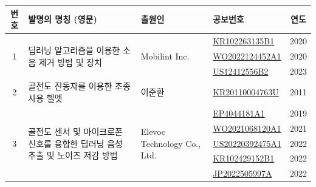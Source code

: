 \documentclass{article}
\begin{document}
\begin{table}[!h]
    \centering
    \renewcommand{\arraystretch}{1.2}
    \begin{tabular}{|c|p{6.5cm}|p{3.5cm}|p{3cm}|c|}
    \hline
    번호 & 발명의 명칭 (영문) & 출원인 & 공보번호 & 연도 \\
    \hline
    
    \multirow{3}{*}{1} 
    & \multirow{3}{=}{딥러닝 알고리즘을 이용한 소음 제거 방법 및 장치} 
    & \multirow{3}{=}{Mobilint Inc.} 
    & \href{https://patents.google.com/patent/KR102263135B1/en?oq=KR102263135B1}{KR102263135B1} & 2020 \\ \cline{4-5}
    &  &  & \href{https://patents.google.com/patent/WO2022124452A1/en?oq=KR102263135B1}{WO2022124452A1} & 2020 \\ \cline{4-5}
    &  &  & \href{https://patents.google.com/patent/US12412556B2/en?oq=KR102263135B1}{US12412556B2} & 2023 \\
    \hline
    
    2 
    & 골전도 진동자를 이용한 조종사용 헬멧 
    & 이준환 
    & \href{https://patents.google.com/patent/KR20110004763U/en?oq=KR20110004763U}{KR20110004763U} 
    & 2011 \\
    \hline
    
    \multirow{5}{*}{3} 
    & \multirow{5}{=}{골전도 센서 및 마이크로폰 신호를 융합한 딥러닝 음성 추출 및 노이즈 저감 방법} 
    & \multirow{5}{=}{Elevoc Technology Co., Ltd.} 
    & \href{https://patents.google.com/patent/EP4044181A4/en?oq=US20220392475A1}{EP4044181A1} & 2019 \\ \cline{4-5}
    &  &  & \href{https://patents.google.com/patent/WO2021068120A1/en?oq=US20220392475A1}{WO2021068120A1} & 2021 \\ \cline{4-5}
    &  &  & \href{https://patents.google.com/patent/US20220392475A1/en?oq=US20220392475A1}{US20220392475A1} & 2022 \\ \cline{4-5}
    &  &  & \href{https://patents.google.com/patent/KR102429152B1/en?oq=US20220392475A1}{KR102429152B1} & 2022 \\ \cline{4-5}
    &  &  & \href{https://patents.google.com/patent/JP2022505997A/en?oq=US20220392475A1}{JP2022505997A} & 2022 \\
    \hline
    

\end{tabular}
\end{table}
\end{document}
